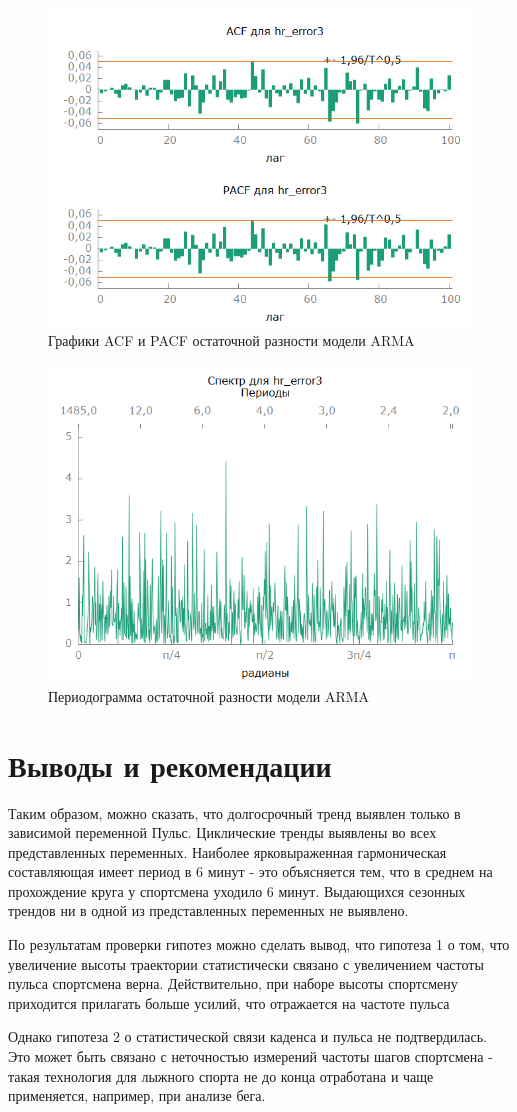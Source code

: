 \documentclass[a4paper,12pt]{article}
\begin{document}
\begin{figure}[H]
	\centering
	\includegraphics[width=0.5\linewidth]{../[graphics]/hr_error3_acf_100.png}
	\caption{Графики ACF и PACF остаточной разности модели ARMA}
	\label{fig:hr_error3_acf_100}
\end{figure}

\begin{figure}[H]
	\centering
	\includegraphics[width=0.5\linewidth]{../[graphics]/hr_error3_spectr.png}
	\caption{Периодограмма остаточной разности модели ARMA}
	\label{fig:hr_error3_spectr}
\end{figure}


\section{Выводы и рекомендации}
Таким образом, можно сказать, что долгосрочный тренд выявлен только в зависимой переменной Пульс. Циклические тренды выявлены во всех представленных переменных. Наиболее ярковыраженная гармоническая составляющая имеет период в 6 минут - это объясняется тем, что в среднем на прохождение круга у спортсмена уходило 6 минут. Выдающихся сезонных трендов ни в одной из представленных переменных не выявлено.  

По результатам проверки гипотез можно сделать вывод, что гипотеза 1 о том, что увеличение высоты траектории статистически связано с увеличением частоты пульса спортсмена верна. Действительно, при наборе высоты спортсмену приходится прилагать больше усилий, что отражается на частоте пульса

Однако гипотеза 2 о статистической связи каденса и пульса не подтвердилась. Это может быть связано с неточностью измерений частоты шагов спортсмена - такая технология для лыжного спорта не до конца отработана и чаще применяется, например, при анализе бега.
\end{document}
